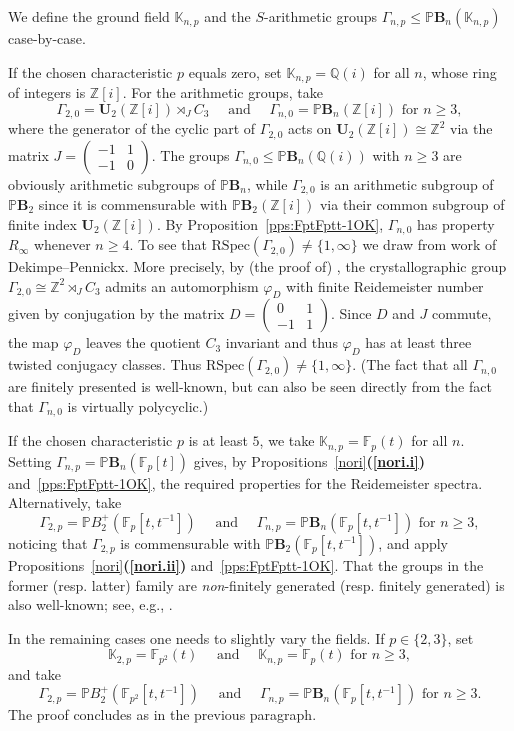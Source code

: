 \documentclass[a4paper,11pt]{amsart}
\makeatletter
\numberwithin{equation}{section}
\theoremstyle{plain}
\theoremstyle{definition}
\renewenvironment{proofof}[1] {\par\pushQED{\qed}\normalfont\topsep6\p@\@plus6\p@\relax\trivlist  \item[\hskip\labelsep
        \bfseries
    Proof of #1.]\ignorespaces}{\popQED\endtrivlist\@endpefalse}
\newcommand{\Z}{\mathbb{Z}}
\newcommand{\Q}{\mathbb{Q}}
\newcommand{\K}{\mathbb{K}}
\newcommand{\F}{\mathbb{F}}
\newcommand{\mbU}{\mathbf{U}} %
\newcommand{\PB}{\mathbb{P}\mathbf{B}} %
\newcommand{\PBplus}{\mathbb{P}B^{+}} %
\newcommand{\phee}{\varphi} %
\newcommand{\Ri}{R_{\infty}} %
\newcommand{\RSpec}{\mathrm{RSpec}}
\newcommand{\bref}[1]{{\bf(\ref{#1})}} %
\makeatother
\begin{document}
\begin{proofof}{Theorem \ref{thm:Lieapplication}}
We define the ground field $\K_{n,p}$ and the $S$-arithmetic groups $\Gamma_{n,p} \leq \PB_n(\K_{n,p})$ case-by-case. 

If the chosen characteristic $p$ equals zero, set $\K_{n,p} = \Q(i)$ for all $n$, whose ring of integers is $\Z[i]$. 
For the arithmetic groups, take 
\[\Gamma_{2,0} = \mbU_2(\Z[i]) \rtimes_J C_3 \quad \text{ and } \quad  \Gamma_{n,0} = \PB_n(\Z[i]) \text{ for } n \geq 3,\]
where the generator of the cyclic part of $\Gamma_{2,0}$ acts on $\mbU_2(\Z[i]) \cong \Z^2$ via the matrix $J = \left( \begin{smallmatrix} -1 & 1 \\ -1 & 0 \end{smallmatrix} \right)$. The groups $\Gamma_{n,0} \leq \PB_n(\Q(i))$ with $n \geq 3$ are obviously arithmetic subgroups of $\PB_n$, while $\Gamma_{2,0}$ is an arithmetic subgroup of $\PB_2$ since it is commensurable with $\PB_2(\Z[i])$ via their common subgroup of finite index $\mbU_2(\Z[i])$. By Proposition~\ref{pps:FptFptt-1OK}, $\Gamma_{n,0}$ has property~$\Ri$ whenever $n \geq 4$. To see that $\RSpec(\Gamma_{2,0}) \neq \{1,\infty\}$ we draw from work of Dekimpe--Pennickx. More precisely, by (the proof of) \cite[Theorem~4.1]{KarelPenni}, the crystallographic group $\Gamma_{2,0} \cong \Z^2 \rtimes_J C_3$ admits an automorphism $\phee_D$ with finite Reidemeister number given by conjugation by the matrix $D = \left( \begin{smallmatrix} 0 & 1 \\ -1 & 1 \end{smallmatrix} \right)$. Since $D$ and $J$ commute, the map $\phee_D$ leaves the quotient $C_3$ invariant and thus $\phee_D$ has at least three twisted conjugacy classes. Thus $\RSpec(\Gamma_{2,0}) \neq \{1,\infty\}$. (The fact that all $\Gamma_{n,0}$ are finitely presented is well-known, but can also be seen directly from the fact that $\Gamma_{n,0}$ is virtually polycyclic.)

If the chosen characteristic $p$ is at least $5$, we take $\K_{n,p} = \F_p(t)$ for all $n$. Setting $\Gamma_{n,p} = \PB_n(\F_p[t])$ gives, by Propositions~\ref{nori}\bref{nori.i} and~\ref{pps:FptFptt-1OK}, the required properties for the Reidemeister spectra. Alternatively, take 
\[ \Gamma_{2,p} = \PBplus_2(\F_p[t,t^{-1}]) \quad \text{ and } \quad \Gamma_{n,p} = \PB_n(\F_p[t,t^{-1}]) \text{ for } n \geq 3, \] 
noticing that $\Gamma_{2,p}$ is commensurable with $\PB_2(\F_p[t,t^{-1}])$, and apply Propositions~\ref{nori}\bref{nori.ii} and~\ref{pps:FptFptt-1OK}. That the groups in the former (resp. latter) family are \emph{non}-finitely generated (resp. finitely generated) is also well-known; see, e.g., \cite[Theorem~1.3]{YuriSoluble}. 

In the remaining cases one needs to slightly vary the fields. If $p \in \{2,3\}$, set
\[ \K_{2,p} = \F_{p^2}(t) \quad \text{ and } \quad \K_{n,p} = \F_p(t) \text{ for } n \geq 3, \]
and take 
\[ \Gamma_{2,p} = \PBplus_2(\F_{p^2}[t,t^{-1}]) \quad \text{ and } \quad \Gamma_{n,p} = \PB_n(\F_p[t,t^{-1}]) \text{ for } n \geq 3. \]
The proof concludes as in the previous paragraph. 
\end{proofof}
\end{document}

